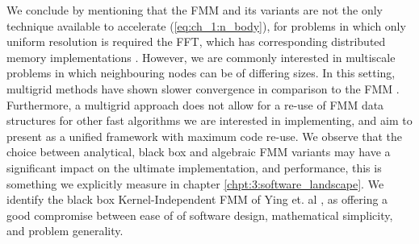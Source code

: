 We conclude by mentioning that the FMM and its variants are not the only technique available to accelerate (\ref{eq:ch_1:n_body}), for problems in which only uniform resolution is required the FFT, which has corresponding distributed memory implementations \cite{gholami2015accfft}. However, we are commonly interested in multiscale problems in which neighbouring nodes can be of differing sizes. In this setting, multigrid methods have shown slower convergence in comparison to the FMM \cite{yokota2015fast,gholami2016fft}. Furthermore, a multigrid approach does not allow for a re-use of FMM data structures for other fast algorithms we are interested in implementing, and aim to present as a unified framework with maximum code re-use. We observe that the choice between analytical, black box and algebraic FMM variants may have a significant impact on the ultimate implementation, and performance, this is something we explicitly measure in chapter \ref{chpt:3:software_landscape}. We identify the black box Kernel-Independent FMM of Ying et. al \cite{Ying:2004:JCP}, as offering a good compromise between ease of of software design, mathematical simplicity, and problem generality.

